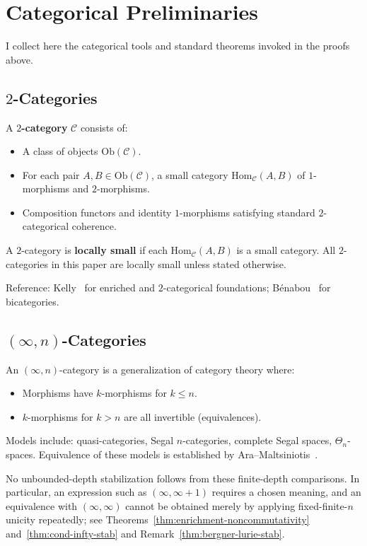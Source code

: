 \documentclass[11pt]{article}
\theoremstyle{plain}
\theoremstyle{definition}
\newcommand{\cC}{\mathcal{C}}
\newcommand{\Ob}{\mathrm{Ob}}
\newcommand{\Hom}{\mathrm{Hom}}
\begin{document}
\appendix

\section{Categorical Preliminaries}\label{app:categorical}

I collect here the categorical tools and standard theorems invoked in the proofs above.

\subsection{\texorpdfstring{$2$-Categories}{2-Categories}}

A \textbf{$2$-category} $\cC$ consists of:
\begin{itemize}
\item A class of objects $\Ob(\cC)$.
\item For each pair $A, B \in \Ob(\cC)$, a small category $\Hom_\cC(A, B)$ of $1$-morphisms and $2$-morphisms.
\item Composition functors and identity $1$-morphisms satisfying standard $2$-categorical coherence.
\end{itemize}

A $2$-category is \textbf{locally small} if each $\Hom_\cC(A, B)$ is a small category. All $2$-categories in this paper are locally small unless stated otherwise.

Reference: Kelly~\cite{Kelly1982} for enriched and $2$-categorical foundations; B\'enabou~\cite{Benabou1967} for bicategories.

\subsection{\texorpdfstring{$(\infty, n)$-Categories}{(infinity,n)-Categories}}

An $(\infty, n)$-category is a generalization of category theory where:
\begin{itemize}
\item Morphisms have $k$-morphisms for $k \leq n$.
\item $k$-morphisms for $k > n$ are all invertible (equivalences).
\end{itemize}

Models include: quasi-categories, Segal $n$-categories, complete Segal spaces, $\Theta_n$-spaces. Equivalence of these models is established by Ara--Maltsiniotis~\cite{AraMaltsiniotis2017}.

No unbounded-depth stabilization follows from these finite-depth comparisons. In particular, an expression such as $(\infty,\infty+1)$ requires a chosen meaning, and an equivalence with $(\infty,\infty)$ cannot be obtained merely by applying fixed-finite-$n$ unicity repeatedly; see Theorems~\ref{thm:enrichment-noncommutativity} and~\ref{thm:cond-infty-stab} and Remark~\ref{thm:bergner-lurie-stab}.
\end{document}
